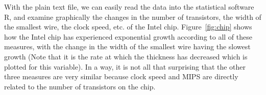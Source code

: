 With the plain text file, we can easily read the data into the
statistical software R, and examine graphically the changes in the
number of transistors, the width of the smallest wire, the clock
speed, etc. of the Intel chip.  Figure~\ref{fig:chip} shows how the
Intel chip has experienced exponential growth according to all of
these measures, with the change in the width of the smallest wire
having the slowest growth (Note that it is the rate at which the
thickness has decreased which is plotted for this variable).  In a
way, it is not all that surprising that the other three measures are
very similar because clock speed and MIPS are directly related to the
number of transistors on the chip.


